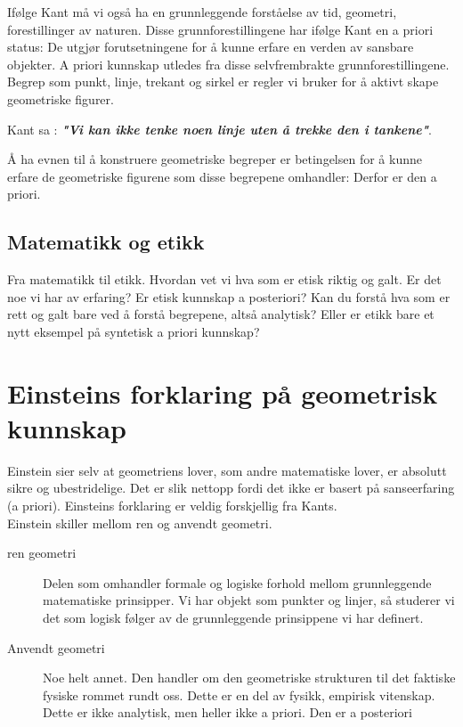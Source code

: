 \documentclass[11pt, a4paper]{article}
\begin{document}
Ifølge Kant må vi også ha en grunnleggende forståelse av tid, geometri, forestillinger av naturen. Disse grunnforestillingene har ifølge Kant en a priori status: De utgjør forutsetningene for å kunne erfare en verden av sansbare objekter. A priori kunnskap utledes fra disse selvfrembrakte grunnforestillingene.\\

Begrep som punkt, linje, trekant og sirkel er regler vi bruker for å aktivt skape geometriske figurer.

Kant sa : \textbf{\textit{"Vi kan ikke tenke noen linje uten å trekke den i tankene"}}.

Å ha evnen til å konstruere geometriske begreper er betingelsen for å kunne erfare de geometriske figurene som disse begrepene omhandler: Derfor er den a priori.

\subsection{Matematikk og etikk}

Fra matematikk til etikk. Hvordan vet vi hva som er etisk riktig og galt. Er det noe vi har av erfaring? Er etisk kunnskap a posteriori? Kan du forstå hva som er rett og galt bare ved å forstå begrepene, altså analytisk? Eller er etikk bare et nytt eksempel på syntetisk a priori kunnskap?


\section{Einsteins forklaring på geometrisk kunnskap}

Einstein sier selv at geometriens lover, som andre matematiske lover, er absolutt sikre og ubestridelige. Det er slik nettopp fordi det ikke er basert på sanseerfaring (a priori). Einsteins forklaring er veldig forskjellig fra Kants.\\


Einstein skiller mellom ren og anvendt geometri. 

\begin{description}
    \item[ren geometri] Delen som omhandler formale og logiske forhold mellom grunnleggende matematiske prinsipper. Vi har objekt som punkter og linjer, så studerer vi det som logisk følger av de grunnleggende prinsippene vi har definert. 
    \item[Anvendt geometri] Noe helt annet. Den handler om den geometriske strukturen til det faktiske fysiske rommet rundt oss. Dette er en del av fysikk, empirisk vitenskap. Dette er ikke analytisk, men heller ikke a priori. Den er a posteriori
\end{description}
\end{document}
